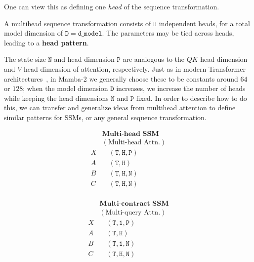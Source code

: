 One can view this as defining one \emph{head} of the sequence transformation.

\begin{definition}
  \label{def:head-pattern}
  A multihead sequence transformation consists of $\mathtt{H}$ independent heads, for a total model dimension of $\mathtt{D}=\mathtt{d\_model}$.
  The parameters may be tied across heads, leading to a \textbf{head pattern}.
\end{definition}

The state size $\mathtt{N}$ and head dimension $\mathtt{P}$ are analogous to the $QK$ head dimension and $V$ head dimension of attention, respectively. Just as in modern Transformer architectures~\citep{chowdhery2022palm,touvron2023llama},
in Mamba-2 we generally choose these to be constants around $64$ or $128$; when the model dimension $\mathtt{D}$ increases, we increase the number of heads while keeping the head dimensions $\mathtt{N}$ and $\mathtt{P}$ fixed. In order to describe how to do this, we can transfer and generalize ideas from multihead attention to define similar patterns for SSMs, or any general sequence transformation.

\begin{minipage}[t]{.25\linewidth}
  \begin{equation}
    \label{eq:multihead}
    \begin{aligned}
        & \textbf{Multi-head SSM} \\
        & (\textrm{Multi-head Attn.}) \\
      X & \quad \mathtt{(T, H, P)} \\
      A & \quad \mathtt{(T, H)} \\
      B & \quad \mathtt{(T, H, N)} \\
      C & \quad \mathtt{(T, H, N)} \\
    \end{aligned}
  \end{equation}
\end{minipage}

\begin{minipage}[t]{.25\linewidth}
  \begin{equation}
    \label{eq:multiquery}
    \begin{aligned}
    & \textbf{Multi-contract SSM} \\
    & (\textrm{Multi-query Attn.}) \\
      X & \quad \mathtt{(T, 1, P)} \\
      A & \quad \mathtt{(T, H)} \\
      B & \quad \mathtt{(T, 1, N)} \\
      C & \quad \mathtt{(T, H, N)} \\
    \end{aligned}
  \end{equation}
\end{minipage}

